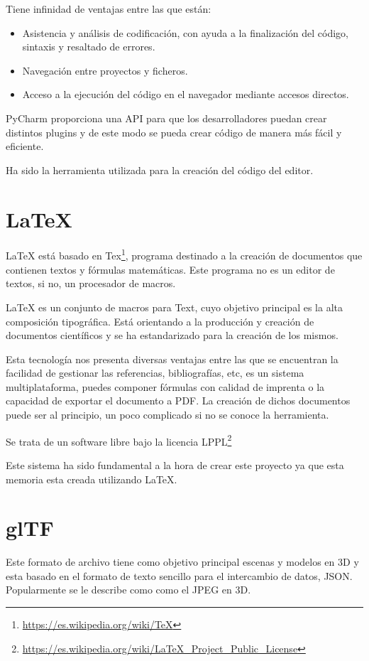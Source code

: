 \documentclass[a4paper, 12pt]{book}
\begin{document}
Tiene infinidad de ventajas entre las que están:

\begin{itemize}
    \item Asistencia y análisis de codificación, con ayuda a la finalización del código, sintaxis y resaltado de errores.
    \item Navegación entre proyectos y ficheros.
    \item Acceso a la ejecución del código en el navegador mediante accesos directos.
\end{itemize}

PyCharm proporciona una API para que los desarrolladores puedan crear distintos plugins y de este modo se pueda crear código de manera más fácil y eficiente.

Ha sido la herramienta utilizada para la creación del código del editor.

\section{LaTeX} %
\label{sec:Latex}
LaTeX está basado en Tex\footnote{\url{https://es.wikipedia.org/wiki/TeX}}, programa destinado a la creación de documentos que contienen textos y fórmulas matemáticas. Este programa no es un editor de textos, si no, un procesador de macros.

LaTeX es un conjunto de macros para Text, cuyo objetivo principal es la alta composición tipográfica. Está orientando a la producción y creación de documentos científicos y se ha estandarizado para la creación de los mismos.

Esta tecnología nos presenta diversas ventajas entre las que se encuentran la facilidad de gestionar las referencias, bibliografías, etc, es un sistema multiplataforma, puedes componer fórmulas con calidad de imprenta o la capacidad de exportar el documento a PDF. La creación de dichos documentos puede ser al principio, un poco complicado si no se conoce la herramienta.

Se trata de un software libre bajo la licencia LPPL\footnote{\url{https://es.wikipedia.org/wiki/LaTeX_Project_Public_License}} 

Este sistema ha sido fundamental a la hora de crear este proyecto ya que esta memoria esta creada utilizando LaTeX.

\section{glTF} %
\label{sec:Gltfs}
Este formato de archivo tiene como objetivo principal escenas y modelos en 3D y esta basado en el formato de texto sencillo para el intercambio de datos, JSON. Popularmente se le describe como como el JPEG en 3D.
\end{document}
